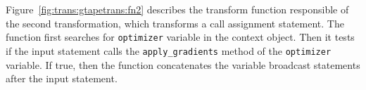 \begin{inred}
Figure~\ref{fig:trans:gtapetrans:fn2} describes the transform function responsible
of the second transformation,
which transforms a call assignment statement.
The function first searches for {\tt optimizer} variable in the context object.
Then it tests if the input statement calls the {\tt apply\_gradients} method 
of the {\tt optimizer} variable.
If true, then the function concatenates the variable broadcast statements
after the input statement.
\end{inred}


% 
% 
